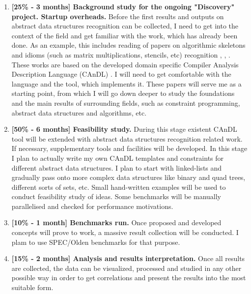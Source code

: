 \documentclass[12pt, a4paper]{article}
\begin{document}
\begin{enumerate}[align=left,leftmargin=*]
\item \textbf{[25\% - 3 months] Background study for the ongoing "Discovery" project. Startup overheads.}\newline 
\null\qquad Before the first results and outputs on abstract data structures recognition can be collected, I need to get into the context of the field and get familiar with the work, which has already been done. As an example, this includes reading of papers on algorithmic skeletons and idioms (such as matrix multiplications, stencils, etc) recognition \cite{algorithmic-skeletons-recognition-paper}, \cite{general-reductions-recognition-paper}, \cite{idioms-recognition-paper}. These works are based on the developed domain specific Compiler Analysis Description Language (CAnDL) \cite{candl-paper}. I will need to get comfortable with the language and the tool, which implements it.\newline
\null\qquad These papers will serve me as a starting point, from which I will go down deeper to study the foundations and the main results of surrounding fields, such as constraint programming, abstract data structures and algorithms, etc.
\item \textbf{[50\% - 6 months] Feasibility study.}\newline
\null\qquad During this stage existent CAnDL tool will be extended with abstract data structures recognition related work. If necessary, supplementary tools and facilities will be developed.\newline 
\null\qquad In this stage I plan to actually write my own CAnDL templates and constraints for different abstract data structures. I plan to start with linked-lists and gradually pass onto more complex data structures like binary and quad trees, different sorts of sets, etc.\newline
\null\qquad Small hand-written examples will be used to conduct feasibility study of ideas. Some benchmarks will be manually parallelised and checked for performance motivations.
	
\item \textbf{[10\% - 1 month] Benchmarks run.}\newline 
\null\qquad Once proposed and developed concepts will prove to work, a massive result collection will be conducted. I plam to use SPEC/Olden benchmarks for that purpose. 
	
\item \textbf{[15\% - 2 months] Analysis and results interpretation.} Once all results are collected, the data can be visualized, processed and studied in any other possible way in order to get correlations and present the results into the most suitable form.
\end{enumerate}
\end{document}
